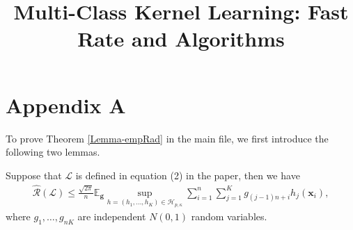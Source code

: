 \documentclass[10pt]{llncs}
\begin{document}
\mainmatter  %


\title{Multi-Class Kernel Learning: Fast Rate and Algorithms}
\author{}
\institute{}

\maketitle
\section{Appendix A}
To prove Theorem \ref{Lemma-empRad} in the main file, we first introduce the following two lemmas.
\begin{lemma}
\label{hatRLlemma}
Suppose that $\mathcal{L}$ is defined in equation \textrm{(2)} in the paper,
then we have
\begin{align*}
  \hat{\mathcal{R}}(\mathcal{L})\leq\frac{\sqrt{2\pi}}{n}\mathbb{E}_{\mathbf g}\sup_{h=(h_1,\ldots,h_K)
  \in\mathcal{H}_{p,\kappa}}\sum_{i=1}^n\sum_{j=1}^Kg_{(j-1)n+i}h_j(\mathbf x_i),
\end{align*}
 where $g_1,\ldots,g_{nK}$ are  independent $N(0,1)$ random variables.
\end{lemma}
\end{document}
